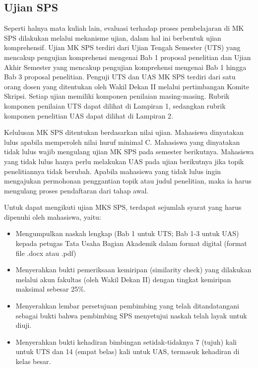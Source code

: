 \documentclass[
  indonesian,
  letterpaper,
]{scrbook}
\providecommand{\tightlist}{%
  \setlength{\itemsep}{0pt}\setlength{\parskip}{0pt}}
\begin{document}
\subsection*{Ujian SPS}\label{ujian-sps}

Seperti halnya mata kuliah lain, evaluasi terhadap proses pembelajaran
di MK SPS dilakukan melalui mekanisme ujian, dalam hal ini berbentuk
ujian komprehensif. Ujian MK SPS terdiri dari Ujian Tengah Semester
(UTS) yang mencakup pengujian komprehensi mengenai Bab 1 proposal
penelitian dan Ujian Akhir Semester yang mencakup pengujian komprehensi
mengenai Bab 1 hingga Bab 3 proposal penelitian. Penguji UTS dan UAS MK
SPS terdiri dari satu orang dosen yang ditentukan oleh Wakil Dekan II
melalui pertimbangan Komite Skripsi. Setiap ujian memiliki komponen
penilaian masing-masing. Rubrik komponen penilaian UTS dapat dilihat di
Lampiran 1, sedangkan rubrik komponen penelitian UAS dapat dilihat di
Lampiran 2.

Kelulusan MK SPS ditentukan berdasarkan nilai ujian. Mahasiswa
dinyatakan lulus apabila memperoleh nilai huruf minimal C. Mahasiswa
yang dinyatakan tidak lulus wajib mengulang ujian MK SPS pada semester
berikutnya. Mahasiswa yang tidak lulus hanya perlu melakukan UAS pada
ujian berikutnya jika topik penelitiannya tidak berubah. Apabila
mahasiswa yang tidak lulus ingin mengajukan permohonan penggantian topik
atau judul penelitian, maka ia harus mengulang proses pendaftaran dari
tahap awal.

Untuk dapat mengikuti ujian MKS SPS, terdapat sejumlah syarat yang harus
dipenuhi oleh mahasiswa, yaitu:

\begin{itemize}
\tightlist
\item
  Mengumpulkan naskah lengkap (Bab 1 untuk UTS; Bab 1-3 untuk UAS)
  kepada petugas Tata Usaha Bagian Akademik dalam format digital (format
  file .docx atau .pdf)
\item
  Menyerahkan bukti pemeriksaan kemiripan (similarity check) yang
  dilakukan melalui akun fakultas (oleh Wakil Dekan II) dengan tingkat
  kemiripan maksimal sebesar 25\%.
\item
  Menyerahkan lembar persetujuan pembimbing yang telah ditandatangani
  sebagai bukti bahwa pembimbing SPS menyetujui naskah telah layak untuk
  diuji.
\item
  Menyerahkan bukti kehadiran bimbingan setidak-tidaknya 7 (tujuh) kali
  untuk UTS dan 14 (empat belas) kali untuk UAS, termasuk kehadiran di
  kelas besar.
\end{itemize}
\end{document}
